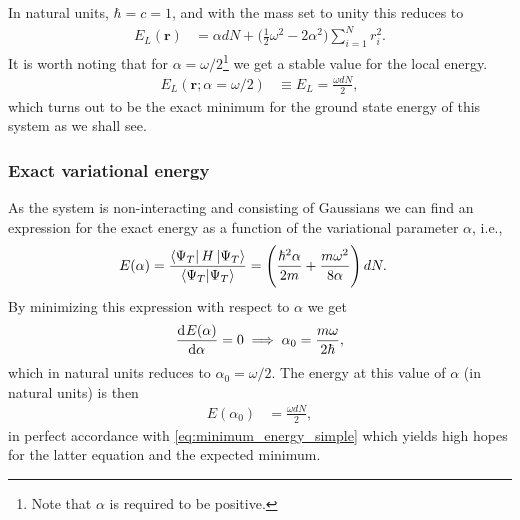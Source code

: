 \documentclass[
    a4paper, aps, twocolumn, floatfix, superscriptaddress,
    nofootinbib]{revtex4-1}
\newcommand{\vf}{\mathbf}
\newcommand{\1}{\mathds{1}}
\newcommand{\half}{\frac{1}{2}}
\begin{document}
        In natural units, $\hbar = c = 1$, and with the mass set to unity this
        reduces to
        \begin{align}
            E_L(\vf{r})
            &=
            \alpha dN
            + \biggl(
                \half\omega^2
                - 2\alpha^2
            \biggr)
            \sum_{i = 1}^N r_i^2.
            \label{eq:closed_form_natural_units_local_energy}
        \end{align}
        It is worth noting that for $\alpha = \omega/2$\footnote{Note that
        $\alpha$ is required to be positive.} we get a stable value for the
        local energy.
        \begin{align}
            E_L(\vf{r}; \alpha = \omega/2)
            &\equiv
            E_L
            =
            \frac{\omega d N}{2},
            \label{eq:minimum_energy_simple}
        \end{align}
        which turns out to be the exact minimum for the ground state energy of
        this system as we shall see.

        \subsubsection{Exact variational energy}
            As the system is non-interacting and consisting of Gaussians we can
            find an expression for the exact energy as a function of the
            variational parameter $\alpha$, i.e.,
            \begin{align}
                E(\alpha)
                &=
                \frac{\bra{\Psi_T}H\ket{\Psi_T}}{\bra{\Psi_T}\ket{\Psi_T}}
                =
                \left(
                    \frac{\hbar^2 \alpha}{2m}
                    + \frac{m\omega^2}{8\alpha}
                \right)dN.
                \label{eq:exact_energy}
            \end{align}
            By minimizing this expression with respect to $\alpha$ we get
            \begin{align}
                \dod[]{E(\alpha)}{\alpha} = 0
                \implies
                \alpha_0 = \frac{m\omega}{2\hbar},
            \end{align}
            which in natural units reduces to $\alpha_0 = \omega/2$. The energy
            at this value of $\alpha$ (in natural units) is then
            \begin{align}
                E(\alpha_0)
                &=
                \frac{\omega dN}{2},
            \end{align}
            in perfect accordance with \autoref{eq:minimum_energy_simple} which
            yields high hopes for the latter equation and the expected minimum.
\end{document}
